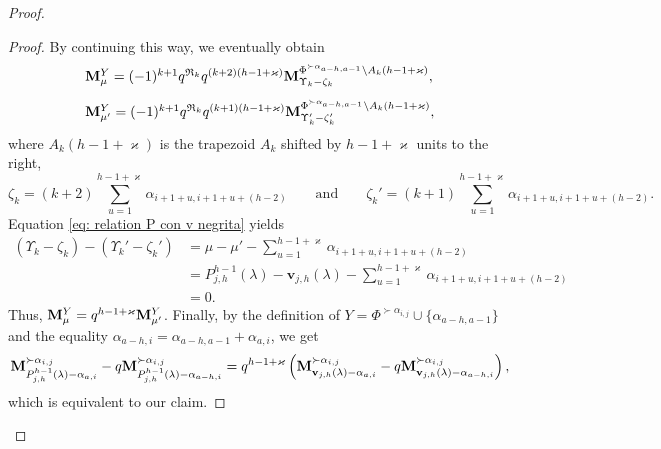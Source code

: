 \begin{proof}
\begin{proof}
By continuing this way, we eventually obtain 
\begin{equation}
    \begin{array}{l}
         \mathbf{M}_{\mu}^Y =(-1)^{k+1}q^{\mathfrak{R}_k}q^{(k+2)(h-1+\varkappa)} \mathbf{M}_{\Upsilon_k-\zeta_k}^{\Phi^{ \succ \alpha_{a-h,a-1}  } \setminus A_k(h-1+\varkappa) }, \\[10pt]
         \mathbf{M}_{\mu'}^Y =(-1)^{k+1}q^{\mathfrak{R}_k} q^{(k+1)(h-1+\varkappa)}\mathbf{M}_{\Upsilon_k'-\zeta_k'}^{\Phi^{ \succ \alpha_{a-h,a-1}  } \setminus A_k(h-1+\varkappa) },
    \end{array}
\end{equation}
where $A_k(h-1+\varkappa)$ is the trapezoid $A_k$ shifted by $h-1+\varkappa$ units to the right,  
\begin{equation}
    \zeta_k=  (k+2) \sum_{u=1}^{h-1+\varkappa}  \alpha_{i+1+u,i+1+u+(h-2)}  \qquad \mbox{and} \qquad   \zeta_k'=  (k+1) \sum_{u=1}^{h-1+\varkappa}  \alpha_{i+1+u,i+1+u+(h-2)} .
\end{equation}
Equation  \eqref{eq: relation P con v negrita} yields
\begin{equation}
\begin{array}{rl}
   ( \Upsilon_k-\zeta_k) -(\Upsilon_k'-\zeta_k')   & \displaystyle = \mu -\mu' - \sum_{u=1}^{h-1+\varkappa}  \alpha_{i+1+u,i+1+u+(h-2)} \\[10pt]
     &\displaystyle =  P_{j,h}^{h-1}(\lambda) -\mathbf{v}_{j,h}(\lambda) - \sum_{u=1}^{h-1+\varkappa}  \alpha_{i+1+u,i+1+u+(h-2)} \\[10pt]
     & =0.
\end{array}
\end{equation}
Thus, $\mathbf{M}_{\mu}^Y= q^{h-1+\varkappa} \mathbf{M}_{\mu'}^Y$.
Finally, by the  definition of $Y=\Phi^{\succ \alpha_{i,j}} \cup \{  \alpha_{a-h,a-1} \} $ and the equality $\alpha_{a-h,i}=\alpha_{a-h,a-1}+\alpha_{a,i}  $, we get
\begin{equation}
       \mathbf{M}_{P_{j,h}^{h-1}(\lambda) - \alpha_{a,i}}^{\succ \alpha_{i,j}} - q\mathbf{M}_{P_{j,h}^{h-1}(\lambda)-\alpha_{a-h,i}}^{\succ \alpha_{i,j}} =
       q^{h-1 + \varkappa } \left( \mathbf{M}_{\mathbf{v}_{j,h}(\lambda)-\alpha_{a,i}}^{\succ \alpha_{i,j}}  -q \mathbf{M}_{\mathbf{v}_{j,h}(\lambda)- \alpha_{a-h,i}}^{\succ \alpha_{i,j}} \right),
\end{equation}
which is equivalent to our claim.
\end{proof}


\end{proof}
